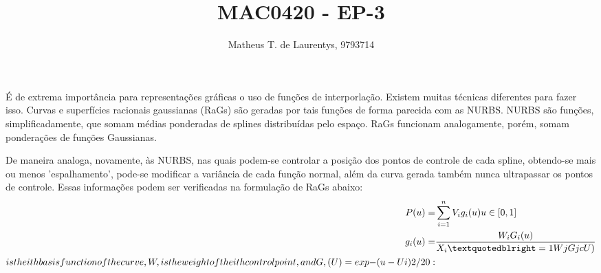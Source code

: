 \documentclass[a4paper]{article}
\begin{document}
	\setlength{\leftskip}{20}
	\title{\vspace {1.0} MAC0420 - EP-3}
	\author{Matheus T. de Laurentys, 9793714}
	\maketitle
	
	É de extrema importância para representações gráficas o uso de funções de interporlação. Existem muitas técnicas diferentes para fazer isso. Curvas e superfícies racionais gaussianas (RaGs) são geradas por tais funções de forma parecida com as NURBS. NURBS são funções, simplificadamente, que somam médias ponderadas de splines distribuídas pelo espaço. RaGs funcionam analogamente, porém, somam ponderações de funções Gaussianas. 
	
	De maneira analoga, novamente, às NURBS, nas quais podem-se controlar a posição dos pontos de controle de cada spline, obtendo-se mais ou menos ’espalhamento’, pode-se modificar a variância de cada função normal, além da curva gerada também nunca ultrapassar os pontos de controle. Essas informações podem ser verificadas na formulação de RaGs abaixo: \\
	\begin{equation*}\label{eq:pareto mle2}
	\begin{split}
	P(u)=& \sum_{i=1}^n V_ig_i(u) \space u\in [0,1] \\
	g_i(u)=& \frac{W_iG_i(u)}{X_i”= 1 WjGjcU)} \\
	is the ith basis function of the curve, W, is the weight of
	the ith control point, and
	G,(U) = exp{ -(u - Ui)2/20:} 
	\end{split}
	\end{equation*}
	
\end{document}
